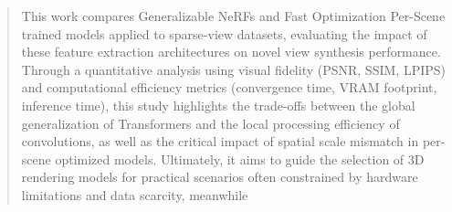 \documentclass[10pt,conference]{IEEEtran}
\begin{document}
\begin{abstract}
This work compares Generalizable NeRFs and Fast Optimization Per-Scene trained models applied to sparse-view datasets, evaluating the impact of these feature extraction architectures on novel view synthesis performance. Through a quantitative analysis using visual fidelity (PSNR, SSIM, LPIPS) and computational efficiency metrics (convergence time, VRAM footprint, inference time), this study highlights the trade-offs between the global generalization of Transformers and the local processing efficiency of convolutions, as well as the critical impact of spatial scale mismatch in per-scene optimized models. Ultimately, it aims to guide the selection of 3D rendering models for practical scenarios often constrained by hardware limitations and data scarcity, meanwhile %
\end{abstract}

\IEEEpeerreviewmaketitle




%
%

\end{document}
